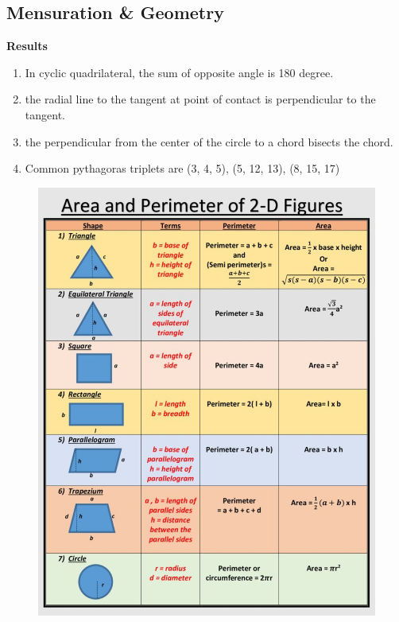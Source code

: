 \subsection{Mensuration \& Geometry}
\textbf{Results}
\begin{enumerate}
    \item In cyclic quadrilateral, the sum of opposite angle is 180 degree.
    \item the radial line to the tangent at point of contact is perpendicular to the tangent.
    \item the perpendicular from the center of the circle to a chord bisects the chord.
    \item Common pythagoras triplets are (3, 4, 5), (5, 12, 13), (8, 15, 17)
\end{enumerate}
\begin{figure}[h!]
    \centering
    \includegraphics[scale=0.70]{images/area-perimeter.png}
\end{figure}
